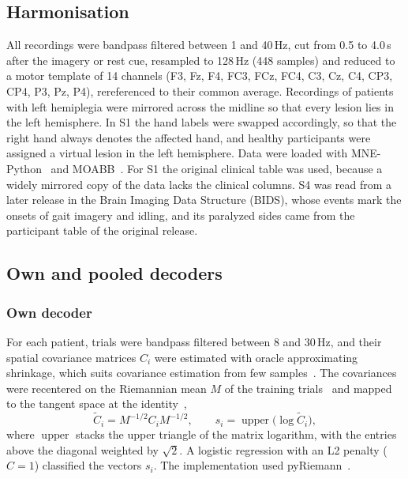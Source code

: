 \documentclass{ieeeaccess}
\begin{document}
\subsection{Harmonisation}\label{sec:harmon}

All recordings were bandpass filtered between 1 and 40\,Hz, cut from 0.5 to 4.0\,s after the imagery or rest cue, resampled to 128\,Hz (448 samples) and reduced to a motor template of 14 channels (F3, Fz, F4, FC3, FCz, FC4, C3, Cz, C4, CP3, CP4, P3, Pz, P4), rereferenced to their common average. Recordings of patients with left hemiplegia were mirrored across the midline so that every lesion lies in the left hemisphere. In S1 the hand labels were swapped accordingly, so that the right hand always denotes the affected hand, and healthy participants were assigned a virtual lesion in the left hemisphere. Data were loaded with MNE-Python~\cite{gramfort2013} and MOABB~\cite{jayaram2018}. For S1 the original clinical table was used, because a widely mirrored copy of the data lacks the clinical columns. S4 was read from a later release in the Brain Imaging Data Structure (BIDS), whose events mark the onsets of gait imagery and idling, and its paralyzed sides came from the participant table of the original release.

\subsection{Own and pooled decoders}\label{sec:decoders}

\subsubsection{Own decoder} For each patient, trials were bandpass filtered between 8 and 30\,Hz, and their spatial covariance matrices $C_i$ were estimated with oracle approximating shrinkage, which suits covariance estimation from few samples~\cite{chen2010}. The covariances were recentered on the Riemannian mean $M$ of the training trials~\cite{zanini2018} and mapped to the tangent space at the identity~\cite{barachant2012},
\begin{equation}
\tilde C_i = M^{-1/2} C_i M^{-1/2}, \qquad s_i = \operatorname{upper}\bigl(\log \tilde C_i\bigr),\label{eq:tangent}
\end{equation}
where $\operatorname{upper}$ stacks the upper triangle of the matrix logarithm, with the entries above the diagonal weighted by $\sqrt{2}$. A logistic regression with an L2 penalty ($C = 1$) classified the vectors $s_i$. The implementation used pyRiemann~\cite{pyriemann}.
\end{document}
